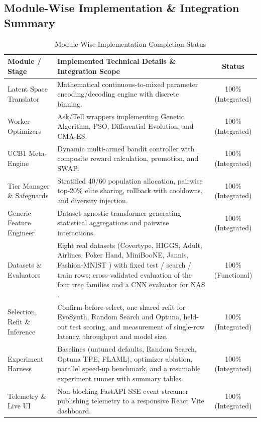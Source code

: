 \documentclass[11pt, a4paper]{article}
\begin{document}
\subsection{Module-Wise Implementation \& Integration Summary}
\begin{table}[H]
    \centering
    \footnotesize
    \renewcommand{\arraystretch}{1.25}
    \begin{tabular}{|p{3.8cm}|p{7.5cm}|c|}
        \hline
        \textbf{Module / Stage} & \textbf{Implemented Technical Details \& Integration Scope} & \textbf{Status} \\
        \hline
        Latent Space Translator & Mathematical continuous-to-mixed parameter encoding/decoding engine with discrete binning. & 100\% (Integrated) \\
        \hline
        Worker Optimizers & Ask/Tell wrappers implementing Genetic Algorithm, PSO, Differential Evolution, and CMA-ES. & 100\% (Integrated) \\
        \hline
        UCB1 Meta-Engine & Dynamic multi-armed bandit controller with composite reward calculation, promotion, and SWAP. & 100\% (Integrated) \\
        \hline
        Tier Manager \& Safeguards & Stratified 40/60 population allocation, pairwise top-20\% elite sharing, rollback with cooldowns, and diversity injection. & 100\% (Integrated) \\
        \hline
        Generic Feature Engineer & Dataset-agnostic transformer generating statistical aggregations and pairwise interactions. & 100\% (Integrated) \\
        \hline
        Datasets \& Evaluators & Eight real datasets (Covertype, HIGGS, Adult, Airlines, Poker Hand, MiniBooNE, Jannis, Fashion-MNIST \cite{xiao2017fashion}) with fixed test / search / train rows; cross-validated evaluation of the four tree families and a CNN evaluator for NAS \cite{zoph2016neural}. & 100\% (Functional) \\
        \hline
        Selection, Refit \& Inference & Confirm-before-select, one shared refit for EvoSynth, Random Search and Optuna, held-out test scoring, and measurement of single-row latency, throughput and model size. & 100\% (Integrated) \\
        \hline
        Experiment Harness & Baselines (untuned defaults, Random Search, Optuna TPE, FLAML), optimizer ablation, parallel speed-up benchmark, and a resumable experiment runner with summary tables. & 100\% (Integrated) \\
        \hline
        Telemetry \& Live UI & Non-blocking FastAPI SSE event streamer publishing telemetry to a responsive React Vite dashboard. & 100\% (Integrated) \\
        \hline
    \end{tabular}
    \caption{Module-Wise Implementation Completion Status}
\end{table}
\end{document}
